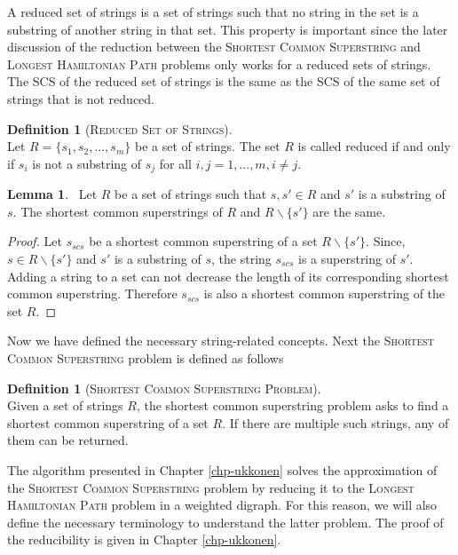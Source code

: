 \documentclass[english,twoside,censored,csm,algorithms-track-2020]{HYthesisML}
\theoremstyle{plain}
\theoremstyle{definition}
\newtheorem{lemma}[theorem]{Lemma}
\newtheorem{definition}[theorem]{Definition}
\numberwithin{testexample}{chapter}
\begin{document}
A reduced set of strings is a set of strings such that no string in the set is a substring
of another string in that set. This property is important since the later discussion of the
reduction between the \textsc{Shortest Common Superstring} and \textsc{Longest Hamiltonian Path}
problems only works for a reduced sets of strings. The SCS of the reduced set of strings
is the same as the SCS of the same set of strings that is not reduced. 

\begin{definition}[\textsc{Reduced Set of Strings}]~\label{def-reduced}\\
  Let $R=\{s_1, s_2,...,s_m\}$ be a set of strings. The set $R$ is called reduced
  if and only if $s_i$ is not a substring of $s_j$ for all $i,j = 1,...,m, i\neq j$.
\end{definition}

\begin{lemma}~\label{lem-reduced}
  Let $R$ be a set of strings such that $s,s'\in R$ and $s'$ is a substring of $s$.
  The shortest common superstrings of $R$ and $R\backslash\{s'\}$ are the same.
\end{lemma}

\begin{proof}
  Let $s_{scs}$ be a shortest common superstring of a set $R\backslash\{s'\}$.
  Since, $s\in R\backslash\{s'\}$ and $s'$ is a substring of $s$, the string
  $s_{scs}$ is a superstring of $s'$. Adding a string to a set can not
  decrease the length of its corresponding shortest common superstring.
  Therefore $s_{scs}$ is also a shortest common superstring of the set
  $R$.
\end{proof}

Now we have defined the necessary string-related concepts. Next the
\textsc{Shortest Common Superstring} problem is defined as follows

\begin{definition}[\textsc{Shortest Common Superstring Problem}]~\label{def-scs-problem}\\
  Given a set of strings $R$, the shortest common superstring problem
  asks to find a shortest common superstring of a set $R$. If there
  are multiple such strings, any of them can be returned.
\end{definition}

The algorithm presented in Chapter \ref{chp-ukkonen} solves the approximation of the
\textsc{Shortest Common Superstring} problem by reducing it to the \textsc{Longest Hamiltonian Path}
problem in a weighted digraph. For this reason, we will also define the necessary terminology
to understand the latter problem. The proof of the reducibility is given in Chapter \ref{chp-ukkonen}.
\end{document}
